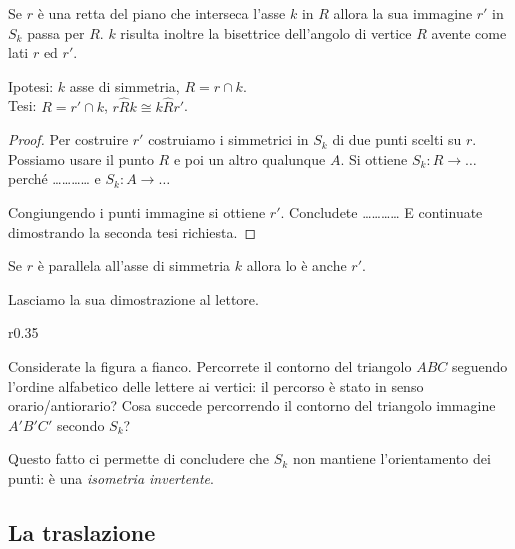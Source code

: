 \begin{teorema}\label{teo:8.4}
Se $r$ è una retta del piano che interseca l'asse $k$ in $R$ allora 
la sua immagine $r'$ in $S_k$ passa per $R$. $k$ risulta inoltre la 
bisettrice dell'angolo di vertice $R$ avente come lati $r$ ed $r'$.
\end{teorema}

\noindent\begin{minipage}{0.65\textwidth}\parindent15pt
\noindent Ipotesi: $k$ asse di simmetria, $R=r\cap k$.\\
Tesi: $R=r'\cap k$, $r\widehat{R}k\cong k\widehat{R}r'$.

\begin{proof}
Per costruire $r'$ costruiamo i simmetrici in $S_k$ di due punti 
scelti su $r$. Possiamo usare il punto $R$ e poi un altro qualunque 
$A$. Si ottiene $S_k: R \rightarrow \ldots{}$ perché 
\ldots\ldots\ldots\ldots{} e $S_k: A \rightarrow \ldots{}$

Congiungendo i punti immagine si ottiene $r'$. Concludete 
\ldots\ldots\ldots\ldots{}
E continuate dimostrando la seconda tesi richiesta.
\end{proof}
\end{minipage}\hfil
\begin{minipage}{0.35\textwidth}
  \centering
\end{minipage}\vspace{5pt}

\begin{teorema}\label{teo:8.5}
Se $r$ è parallela all'asse di simmetria $k$ allora lo è anche $r'$.
\end{teorema}

Lasciamo la sua dimostrazione al lettore.

\setlength{\intextsep}{3pt plus 2.0pt minus 2.0pt}
\begin{wrapfigure}{r}{0.35\textwidth}
  \centering
\end{wrapfigure}
Considerate la figura a fianco. Percorrete il contorno del triangolo 
$ABC$ seguendo l'ordine alfabetico delle lettere ai vertici: il 
percorso è stato in senso orario/antiorario? Cosa succede percorrendo 
il contorno del triangolo immagine $A'B'C'$ secondo $S_k$?

Questo fatto ci permette di concludere che $S_k$ non mantiene 
l'orientamento dei punti: è una \emph{isometria invertente}.

\subsection{La traslazione}

